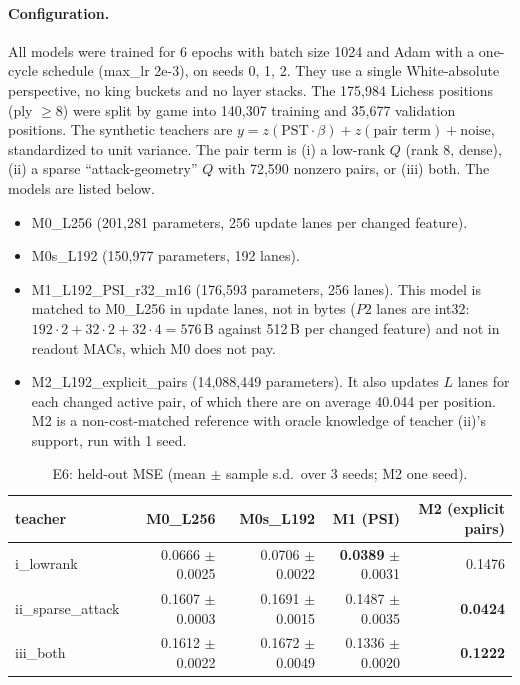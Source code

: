 \paragraph{Configuration.}
All models were trained for 6 epochs with batch size 1024 and Adam with a one-cycle schedule (max\_lr 2e-3), on seeds 0, 1, 2.
They use a single White-absolute perspective, no king buckets and no layer stacks.
The 175,984 Lichess positions (ply $\ge8$) were split by game into 140,307 training and 35,677 validation positions.
The synthetic teachers are $y=z(\mathrm{PST}\cdot\beta)+z(\text{pair term})+\text{noise}$, standardized to unit variance.
The pair term is (i) a low-rank $Q$ (rank 8, dense), (ii) a sparse ``attack-geometry'' $Q$ with 72,590 nonzero pairs, or (iii) both.
The models are listed below.
\begin{itemize}[leftmargin=*,itemsep=1pt]
\item M0\_L256 (201,281 parameters, 256 update lanes per changed feature).
\item M0s\_L192 (150,977 parameters, 192 lanes).
\item M1\_L192\_PSI\_r32\_m16 (176,593 parameters, 256 lanes). This model is matched to M0\_L256 in update lanes, not in bytes ($P2$ lanes are int32: $192\cdot2+32\cdot2+32\cdot4=576$\,B against 512\,B per changed feature) and not in readout MACs, which M0 does not pay.
\item M2\_L192\_explicit\_pairs (14,088,449 parameters). It also updates $L$ lanes for each changed active pair, of which there are on average 40.044 per position. M2 is a non-cost-matched reference with oracle knowledge of teacher (ii)'s support, run with 1 seed.
\end{itemize}

\begin{table}[htbp]
\centering\small
\caption{E6: held-out MSE (mean $\pm$ sample s.d.\ over 3 seeds; M2 one seed).}\label{tab:e6}
\begin{tabular}{@{}lrrrr@{}}
\toprule
teacher & M0\_L256 & M0s\_L192 & M1 (PSI) & M2 (explicit pairs)\\
\midrule
i\_lowrank & 0.0666 $\pm$ 0.0025 & 0.0706 $\pm$ 0.0022 & \textbf{0.0389} $\pm$ 0.0031 & 0.1476\\
ii\_sparse\_attack & 0.1607 $\pm$ 0.0003 & 0.1691 $\pm$ 0.0015 & 0.1487 $\pm$ 0.0035 & \textbf{0.0424}\\
iii\_both & 0.1612 $\pm$ 0.0022 & 0.1672 $\pm$ 0.0049 & 0.1336 $\pm$ 0.0020 & \textbf{0.1222}\\
\bottomrule
\end{tabular}
\end{table}


